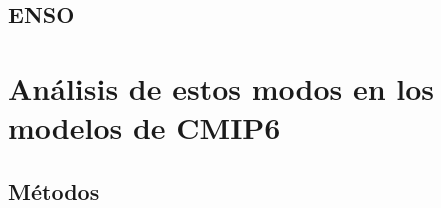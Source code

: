 \documentclass[12pt,oneside]{reedthesis}
\begin{document}
\hypertarget{enso}{%
\subsection{ENSO}\label{enso}}


\hypertarget{anuxe1lisis-de-estos-modos-en-los-modelos-de-cmip6}{%
\section{Análisis de estos modos en los modelos de CMIP6}\label{anuxe1lisis-de-estos-modos-en-los-modelos-de-cmip6}}

\hypertarget{muxe9todos}{%
\subsection{Métodos}\label{muxe9todos}}
\end{document}
